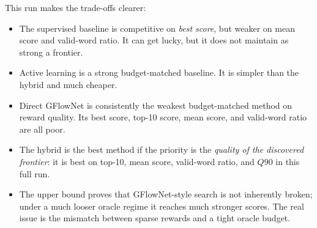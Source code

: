 \documentclass[10pt]{article}
\begin{document}
\begin{table}[t]
\centering
\small
\caption{Complete \(5\)-seed comparison run \texttt{2026-03-29\_21-59-01}. The upper bound is not budget matched.}
\label{tab:full}
\end{table}

This run makes the trade-offs clearer:
\begin{itemize}
    \item The supervised baseline is competitive on \emph{best score}, but weaker on mean score and valid-word ratio. It can get lucky, but it does not maintain as strong a frontier.
    \item Active learning is a strong budget-matched baseline. It is simpler than the hybrid and much cheaper.
    \item Direct GFlowNet is consistently the weakest budget-matched method on reward quality. Its best score, top-10 score, mean score, and valid-word ratio are all poor.
    \item The hybrid is the best method if the priority is the \emph{quality of the discovered frontier}: it is best on top-10, mean score, valid-word ratio, and \(Q90\) in this full run.
    \item The upper bound proves that GFlowNet-style search is not inherently broken; under a much looser oracle regime it reaches much stronger scores. The real issue is the mismatch between sparse rewards and a tight oracle budget.
\end{itemize}
\end{document}
